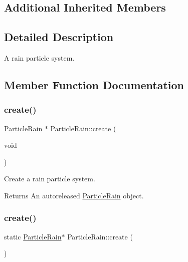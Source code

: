 \subsection*{Additional Inherited Members}


\subsection{Detailed Description}
A rain particle system. 

\subsection{Member Function Documentation}
\mbox{\label{classParticleRain_a75183441b5fad3654e7b9cdfe55295aa}} 
\subsubsection{\texorpdfstring{create()}{create()}\hspace{0.1cm}{\footnotesize\ttfamily [1/2]}}
{\footnotesize\ttfamily \hyperlink{classParticleRain}{Particle\+Rain} $\ast$ Particle\+Rain\+::create (\begin{DoxyParamCaption}\item[{void}]{ }\end{DoxyParamCaption})\hspace{0.3cm}{\ttfamily [static]}}

Create a rain particle system.

\begin{DoxyReturn}{Returns}
An autoreleased \hyperlink{classParticleRain}{Particle\+Rain} object. 
\end{DoxyReturn}
\mbox{\label{classParticleRain_a4692030065ad66d65d22da7b57f2cc23}} 
\subsubsection{\texorpdfstring{create()}{create()}\hspace{0.1cm}{\footnotesize\ttfamily [2/2]}}
{\footnotesize\ttfamily static \hyperlink{classParticleRain}{Particle\+Rain}$\ast$ Particle\+Rain\+::create (\begin{DoxyParamCaption}{ }\end{DoxyParamCaption})\hspace{0.3cm}{\ttfamily [static]}}

